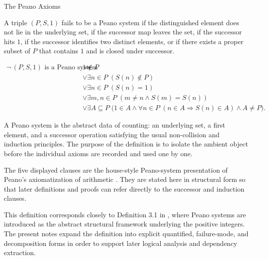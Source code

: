 \begin{topicbox}{The Peano Axioms}
\begin{remark*}
A triple $(P,S,1)$ fails to be a Peano system if the distinguished element
does not lie in the underlying set, if the successor map leaves the set, if
the successor hits $1$, if the successor identifies two distinct elements, or
if there exists a proper subset of $P$ that contains $1$ and is closed under
successor.
\end{remark*}

\begin{remark*}
\[
\begin{aligned}
\neg\,\text{$(P,S,1)$ is a Peano system}
\Longrightarrow\;&
1 \notin P \\
&\lor \exists n \in P\;(S(n) \notin P) \\
&\lor \exists n \in P\;(S(n)=1) \\
&\lor \exists m,n \in P\;(m \neq n \land S(m)=S(n)) \\
&\lor \exists A \subseteq P\;
\bigl(1 \in A \land
\forall n \in P\;(n \in A \Longrightarrow S(n) \in A)
\land A \neq P\bigr).
\end{aligned}
\]
\end{remark*}

\begin{remark*}[Interpretation]
A Peano system is the abstract data of counting: an underlying set, a first
element, and a successor operation satisfying the usual non-collision and
induction principles. The purpose of the definition is to isolate the ambient
object before the individual axioms are recorded and used one by one.
\end{remark*}

\begin{remark*}
The five displayed clauses are the house-style Peano-system presentation of
Peano's axiomatization of arithmetic \citep{PeanoArithmeticesPrincipia1889}.
They are stated here in structural form so that later definitions and proofs
can refer directly to the successor and induction clauses.
\end{remark*}

\begin{remark*}
This definition corresponds closely to Definition 3.1 in
\citet{FefermanNumberSystems1964}, where Peano systems are introduced as the
abstract structural framework underlying the positive integers. The present
notes expand the definition into explicit quantified, failure-mode, and
decomposition forms in order to support later logical analysis and dependency
extraction.
\end{remark*}


\end{topicbox}
